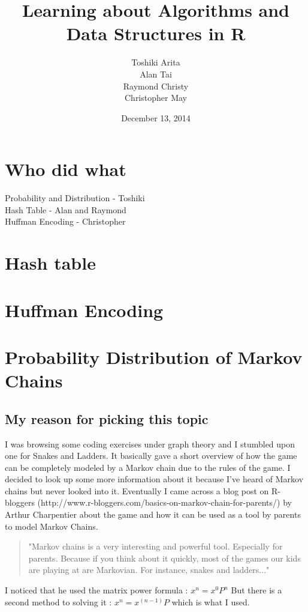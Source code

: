 \documentclass[11pt]{article}
\title{\textbf{Learning about Algorithms and Data Structures in R}}
\author{Toshiki Arita\\
Alan Tai\\
Raymond Christy\\
Christopher May}
\date{December 13, 2014}
\begin{document}
\maketitle

\section{Who did what}
Probability and Distribution - Toshiki\\
Hash Table - Alan and Raymond \\
Huffman Encoding - Christopher \\

\section{Hash table}

\section{Huffman Encoding}


\section{Probability Distribution of Markov Chains}

\subsection{My reason for picking this topic}
I was browsing some coding exercises under graph theory and I stumbled upon one for Snakes and Ladders. It basically gave a short overview of how the game can be completely modeled by a Markov chain due to the rules of the game. I decided to look up some more information about it because I've heard of Markov chains but never looked into it. Eventually I came across a blog post on R-bloggers (http://www.r-bloggers.com/basics-on-markov-chain-for-parents/) by Arthur Charpentier about the game and how it can be used as a tool by parents to model Markov Chains.

\begin{quote}
"Markov chains is a very interesting and powerful tool. Especially for parents. Because if you think about it quickly, most of the games our kids are playing at are Markovian. For instance, snakes and ladders..."
\end{quote}

I noticed that he used the matrix power formula :
\begin{math}
	x^n = x^{0}P^n
\end{math}
But there is a second method to solving it : 
\begin{math}
x^n = x^{(n-1)}P
\end{math}
which is what I used. 
\end{document}
